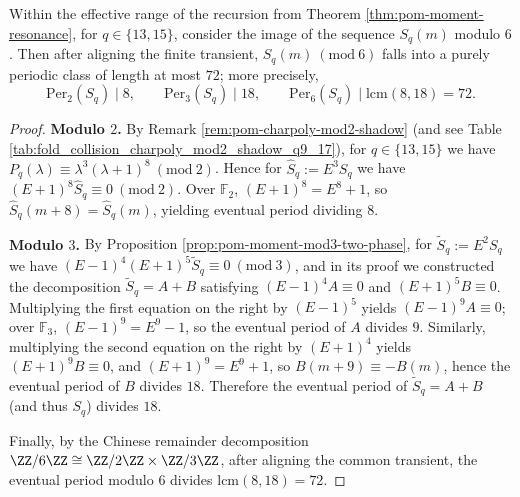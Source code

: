 \begin{corollary}\label{cor:pom-mod6-period-collapse-72-q13-15}
Within the effective range of the recursion from Theorem \ref{thm:pom-moment-resonance}, for \(q\in\{13,15\}\), consider the image of the sequence \(S_q(m)\) modulo \(6\).
Then after aligning the finite transient, \(S_q(m)\ (\mathrm{mod}\ 6)\) falls into a purely periodic class of length at most \(72\); more precisely,
\[
\mathrm{Per}_2(S_q)\mid 8,\qquad \mathrm{Per}_3(S_q)\mid 18,\qquad \mathrm{Per}_6(S_q)\mid \mathrm{lcm}(8,18)=72.
\]
\end{corollary}
\begin{proof}
\textbf{Modulo \(2\).} By Remark \ref{rem:pom-charpoly-mod2-shadow} (and see Table \ref{tab:fold_collision_charpoly_mod2_shadow_q9_17}), for \(q\in\{13,15\}\) we have
\(
P_q(\lambda)\equiv \lambda^3(\lambda+1)^8\ (\mathrm{mod}\ 2)
\).
Hence for \(\widehat S_q:=E^3S_q\) we have \((E+1)^8\widehat S_q\equiv 0\ (\mathrm{mod}\ 2)\).
Over \(\mathbb{F}_2\), \((E+1)^8=E^8+1\), so \(\widehat S_q(m+8)=\widehat S_q(m)\), yielding eventual period dividing \(8\).
\par
\textbf{Modulo \(3\).} By Proposition \ref{prop:pom-moment-mod3-two-phase}, for \(\widetilde S_q:=E^2S_q\) we have
\(
(E-1)^4(E+1)^5\widetilde S_q\equiv 0\ (\mathrm{mod}\ 3)
\), and in its proof we constructed the decomposition \(\widetilde S_q=A+B\) satisfying
\(
(E-1)^4A\equiv 0
\)
and
\(
(E+1)^5B\equiv 0
\).
Multiplying the first equation on the right by \((E-1)^5\) yields \((E-1)^9A\equiv 0\); over \(\mathbb{F}_3\), \((E-1)^9=E^9-1\), so the eventual period of \(A\) divides \(9\).
Similarly, multiplying the second equation on the right by \((E+1)^4\) yields \((E+1)^9B\equiv 0\), and \((E+1)^9=E^9+1\), so \(B(m+9)\equiv -B(m)\), hence the eventual period of \(B\) divides \(18\).
Therefore the eventual period of \(\widetilde S_q=A+B\) (and thus \(S_q\)) divides \(18\).
\par
Finally, by the Chinese remainder decomposition \(\ZZ/6\ZZ\cong \ZZ/2\ZZ\times \ZZ/3\ZZ\), after aligning the common transient, the eventual period modulo \(6\) divides \(\mathrm{lcm}(8,18)=72\).
\end{proof}


